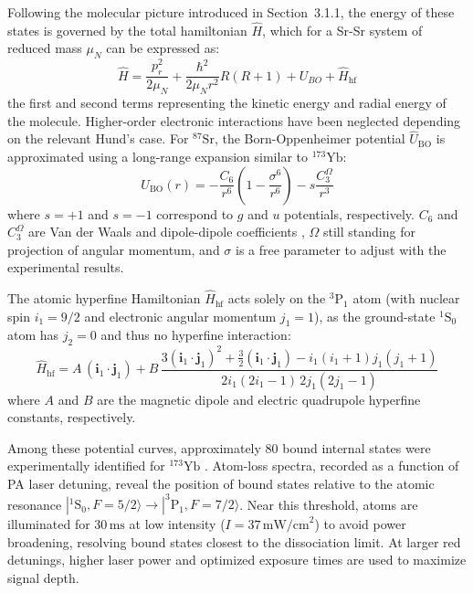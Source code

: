 Following the molecular picture introduced in Section~3.1.1, the energy of these states is governed by the total hamiltonian $\hat{H}$, which for a Sr-Sr system of reduced mass $\mu_N$ can be expressed as:
\begin{equation}
    \hat{H} = \frac{p_r^2}{2\mu_N} + \frac{\hbar^2}{2\mu_N r^2} R(R+1) + U_{BO} + \hat{H}_{\text{hf}}
    \label{eq:general_hamiltonian_molecule}
\end{equation}
the first and second terms representing the kinetic energy and radial energy of the molecule. Higher-order electronic interactions have been neglected depending on the relevant Hund's case. For $^{87}\text{Sr}$, 
the Born-Oppenheimer potential $\hat{U}_{\text{BO}}$ is approximated using a long-range expansion similar to $^{173}\text{Yb}$:
\begin{equation}
    U_{\text{BO}}(r) = -\frac{C_6}{r^6} \left( 1 - \frac{\sigma^6}{r^6} \right) - s \frac{C_3^{\Omega}}{r^3}
    \label{eq:sr_potential}
\end{equation}
where $s = +1$ and $s = -1$ correspond to $g$ and $u$ potentials, respectively. $C_6$ and $C_3^{\Omega}$ are Van der Waals and dipole-dipole coefficients \cite{borkowski_line_2009}, $\Omega$ still standing for 
projection of angular momentum, and $\sigma$ is a free parameter to adjust with the experimental results.

The atomic hyperfine Hamiltonian $\hat{H}_{\text{hf}}$ acts solely on the $^3\text{P}_1$ atom (with nuclear spin $i_1 = 9/2$ and electronic angular momentum $j_1 = 1$), as the ground-state $^1\text{S}_0$ atom has 
$j_2 = 0$ and thus no hyperfine interaction:
\begin{equation}
    \hat{H}_{\text{hf}} = A \, (\mathbf{i}_1 \cdot \mathbf{j}_1) + B \, \frac{3(\mathbf{i}_1 \cdot \mathbf{j}_1)^2 + \frac{3}{2}(\mathbf{i}_1 \cdot \mathbf{j}_1) - i_1(i_1+1) j_1(j_1+1)}{2 i_1 (2 i_1 - 1) \, 2 j_1 
    (2 j_1 - 1)}
\end{equation}
where $A$ and $B$ are the magnetic dipole and electric quadrupole hyperfine constants, respectively.

Among these potential curves, approximately 80 bound internal states were experimentally identified for $^{173}\text{Yb}$ \cite{han_photoassociation_2018}. Atom-loss spectra, recorded as a function of PA laser 
detuning, reveal the position of bound states relative to the atomic resonance $|^1\text{S}_0, F=5/2\rangle \to |^3\text{P}_1, F=7/2\rangle$. Near this threshold, atoms are illuminated for $30\,\text{ms}$ at low 
intensity ($I = 37\,\text{mW/cm}^2$) to avoid power broadening, resolving bound states closest to the dissociation limit. At larger red detunings, higher laser power and optimized exposure times are used to maximize
 signal depth.

